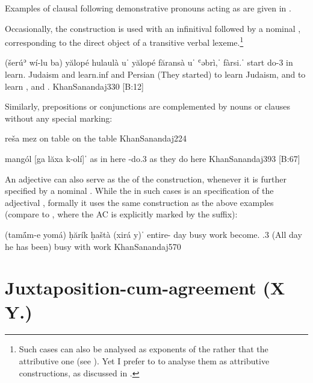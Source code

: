 Examples of clausal \secns following demonstrative pronouns acting as \prims are given in . 

\largerpage
Occasionally, the  construction is used with an infinitival \prim followed by a nominal \secn, corresponding to the direct object of a transitive verbal lexeme.\footnote{Such cases can also be analysed as exponents of the  rather that the attributive one (see ). Yet I prefer to to analyse them as attributive constructions, as discussed in .}

{(šerúʾ wí-lu ba\cb{}) yălopé hulaulà \cb{}uˈ yălopé făransà \cb{}uˈ ʿəbrì,ˈ fàrsi.ˈ} 
{start do-3\pl{} in learn.\inf{} Judaism \cb{}and learn.inf{}  \cb{}and  Persian}
{(They started) to learn Judaism, and to learn ,  and .}
{KhanSanandaj}{330 {[B:12]}}

 
Similarly, prepositions or conjunctions are complemented  by nouns or clauses without any special marking:

{reša mez}
{on table}
{on the table}
{KhanSanandaj}{224}

{mangól [ga\cb{} lăxa k-olí]ˈ}
{as in\cb{} here \ind-do.3\pl}
{as they do here\footnotemark}
{KhanSanandaj}{393 {[B:67]}}


An adjective can also serve as the \prim of the  construction, whenever it is further specified by a nominal \secn. While the \secn in such cases is an  specification of the adjectival \prim, formally it uses the same  construction as the above examples (compare to , where the AC is explicitly marked by the \ez* suffix): 


{(tamā́m-e yomá) ḥărík ḥaštà (xirá \cb{}y)ˈ} 
{entire-\ez{} day busy work become.\resl{} \cb{}\cop.3\masc} 
{(All day he has been) busy with work}
{KhanSanandaj}{570} 

\section{Juxtaposition-cum-agreement (X Y.\agr)} \label{ss:JSan_juxt_agr}

